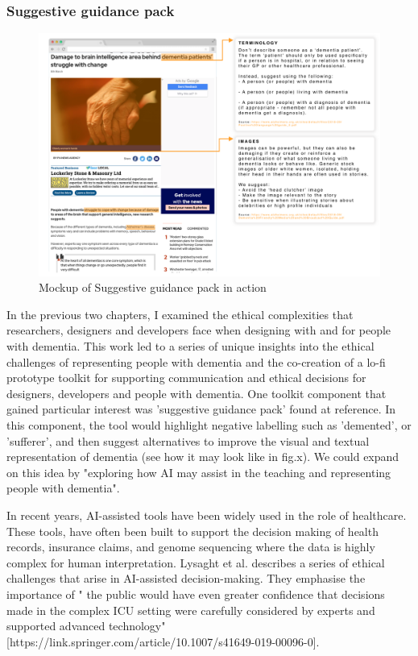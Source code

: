 \subsubsection{Suggestive guidance pack}
\label{FutureStudyThree}
\begin{figure}[htp]
\centering
\includegraphics[width=1\linewidth]{Images/Discussion/Aware-AI.png}
\caption{Mockup of Suggestive guidance pack
 in action}
\label{fig:AwareAI}
\end{figure}
In the previous two chapters, I examined the ethical complexities that researchers, designers and developers face when designing with and for people with dementia. This work led to a series of unique insights into the ethical challenges of representing people with dementia and the co-creation of a lo-fi prototype toolkit for supporting communication and ethical decisions for designers, developers and people with dementia. One toolkit component that gained particular interest was 'suggestive guidance pack' found at reference. In this component, the tool would highlight negative labelling such as 'demented', or 'sufferer', and then suggest alternatives to improve the visual and textual representation of dementia (see how it may look like in fig.x). We could expand on this idea by "exploring how AI may assist in the teaching and representing people with dementia".

In recent years, AI-assisted tools have been widely used in the role of healthcare. These tools, have often been built to support the decision making of health records, insurance claims, and genome sequencing where the data is highly complex for human interpretation. Lysaght et al. describes a series of ethical challenges that arise in AI-assisted decision-making. They emphasise the importance of " the public would have even greater confidence that decisions made in the complex ICU setting were carefully considered by experts and supported advanced technology" [https://link.springer.com/article/10.1007/s41649-019-00096-0].

